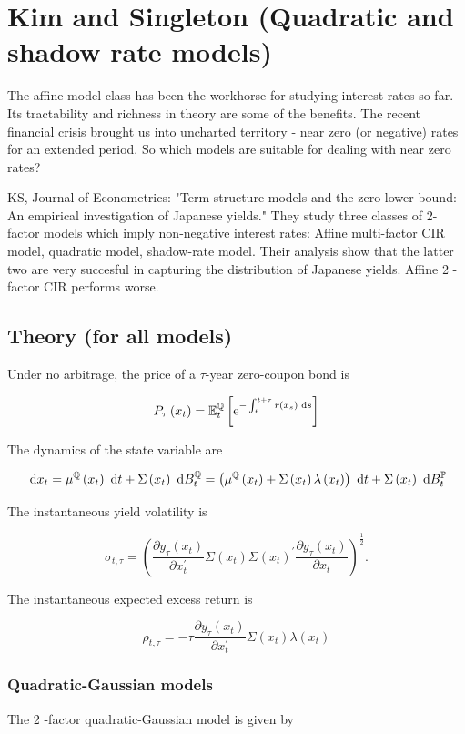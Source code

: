 \chapter{Kim and Singleton (Quadratic and shadow rate models)}
The affine model class has been the workhorse for studying interest rates so far. Its tractability and richness in theory are some of the benefits. The recent financial crisis brought us into uncharted territory - near zero (or negative) rates for an extended period. So which models are suitable for dealing with near zero rates?

KS, Journal of Econometrics: "Term structure models and the zero-lower bound: An empirical investigation of Japanese yields." They study three classes of 2-factor models which imply non-negative interest rates: Affine multi-factor CIR model, quadratic model, shadow-rate model. Their analysis show that the latter two are very succesful in capturing the distribution of Japanese yields. Affine 2 -factor CIR performs worse.

\section{Theory (for all models)}
Under no arbitrage, the price of a $\tau$-year zero-coupon bond is

$$
P_{\tau}\left(x_{t}\right)=\mathbb{E}_{t}^{\mathbb{Q}}\left[\mathrm{e}^{-\int_{t}^{t+\tau} r\left(x_{s}\right) \text{ d}  s}\right]
$$

The dynamics of the state variable are

$$
\text{ d}  x_{t}=\mu^{\mathbb{Q}}\left(x_{t}\right) \text{ d}  t+\Sigma\left(x_{t}\right) \text{ d}  B_{t}^{\mathbb{Q}}=\left(\mu^{\mathbb{Q}}\left(x_{t}\right)+\Sigma\left(x_{t}\right) \lambda\left(x_{t}\right)\right) \text{ d}  t+\Sigma\left(x_{t}\right) \text{ d}  B_{t}^{\mathbb{P}}
$$

The instantaneous yield volatility is

$$
\sigma_{t, \tau}=\left(\frac{\partial y_{\tau}\left(x_{t}\right)}{\partial x_{t}^{\prime}} \Sigma\left(x_{t}\right) \Sigma\left(x_{t}\right)^{\prime} \frac{\partial y_{\tau}\left(x_{t}\right)}{\partial x_{t}}\right)^{\frac{1}{2}} .
$$

The instantaneous expected excess return is

$$
\rho_{t, \tau}=-\tau \frac{\partial y_{\tau}\left(x_{t}\right)}{\partial x_{t}^{\prime}} \Sigma\left(x_{t}\right) \lambda\left(x_{t}\right)
$$

\subsection{Quadratic-Gaussian models}
The 2 -factor quadratic-Gaussian model is given by

